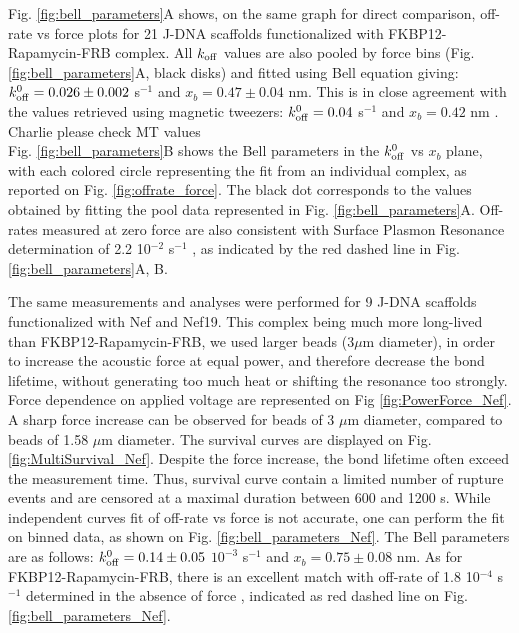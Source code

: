 \documentclass{biophys-new}
\begin{document}
Fig. \ref{fig:bell_parameters}A shows, on the same graph for direct comparison, off-rate vs force plots for 21 J-DNA scaffolds functionalized with FKBP12-Rapamycin-FRB complex. All $ k_{\rm off}$ values are also pooled by force bins (Fig. \ref{fig:bell_parameters}A, black disks) and fitted using Bell equation giving: $k^0_{\rm off}=0.026 \pm 0.002$  s$^{-1}$ and $x_b = 0.47 \pm 0.04$ nm. This is in close agreement with the values retrieved using magnetic tweezers: $k^0_{\rm off}=0.04$ s$^{-1}$ and $x_b=0.42$ nm \cite{kostrz2019}.
{\color{red}Charlie please check MT values }\\
Fig. \ref{fig:bell_parameters}B shows the Bell parameters in the $k^0_{\rm off}$ vs $x_b$ plane, with each colored circle representing the fit from an individual complex, as reported on Fig. \ref{fig:offrate_force}. The black dot corresponds to the values obtained by fitting the pool data represented in Fig. \ref{fig:bell_parameters}A. Off-rates measured at zero force are also consistent with Surface Plasmon Resonance determination of 2.2 10$^{-2}$ s$^{-1}$ \cite{banaszynski2005}, as indicated by the red dashed line in Fig. \ref{fig:bell_parameters}A, B. 

The same measurements and analyses were performed for 9 J-DNA scaffolds functionalized with Nef and Nef19. This complex being much more long-lived than FKBP12-Rapamycin-FRB, we used larger beads (3$\mu$m diameter), in order to increase the acoustic force at equal power, and therefore decrease the bond lifetime, without generating too much heat or shifting the resonance too strongly. Force dependence on applied voltage are represented on Fig \ref{fig:PowerForce_Nef}. A sharp force increase can be observed for beads of 3 $\mu$m diameter, compared to beads of 1.58 $\mu$m diameter. The survival curves are displayed on Fig. \ref{fig:MultiSurvival_Nef}. Despite the force increase, the bond lifetime often exceed the measurement time. Thus, survival curve contain a limited number of rupture events and are censored at a maximal duration between 600 and 1200 s. While independent curves fit of off-rate vs force is not accurate, one can perform the fit on binned data, as shown on Fig. \ref{fig:bell_parameters_Nef}. The Bell parameters are as follows:  $k^0_{\rm off}=0.14 \pm 0.05$  $10^{-3}$  s$^{-1}$ and $x_b = 0.75 \pm 0.08$ nm. As for FKBP12-Rapamycin-FRB, there is an excellent match with off-rate of 1.8 10$^{-4}$ s$^{-1}$ determined in the absence of force \cite{bouchet2011}, indicated as red dashed line on Fig. \ref{fig:bell_parameters_Nef}.
 
\end{document}
